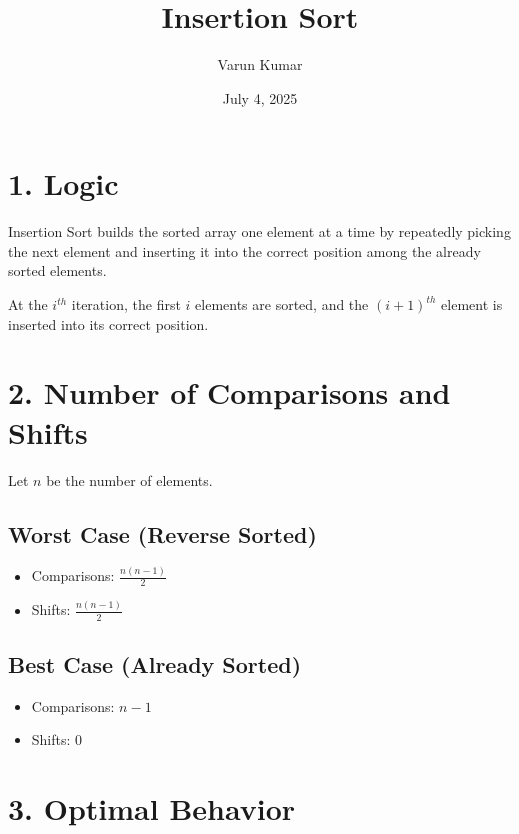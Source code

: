 \documentclass[14pt]{extarticle}
\title{\textbf{Insertion Sort }}
\author{Varun Kumar}
\date{July 4, 2025}
\begin{document}
\maketitle

\section*{1. Logic}

Insertion Sort builds the sorted array one element at a time by repeatedly picking the next element and inserting it into the correct position among the already sorted elements.

\begin{tcolorbox}[
  colback=white,
  colframe=black,
  title=Key Idea
]
At the $i^{th}$ iteration, the first $i$ elements are sorted, and the $(i+1)^{th}$ element is inserted into its correct position.
\end{tcolorbox}

\section*{2. Number of Comparisons and Shifts}

Let $n$ be the number of elements.

\subsection*{Worst Case (Reverse Sorted)}

\begin{itemize}
    \item Comparisons: $\frac{n(n-1)}{2}$
    \item Shifts: $\frac{n(n-1)}{2}$
\end{itemize}

\subsection*{Best Case (Already Sorted)}

\begin{itemize}
    \item Comparisons: $n - 1$
    \item Shifts: $0$
\end{itemize}

\section*{3. Optimal Behavior}
\end{document}
